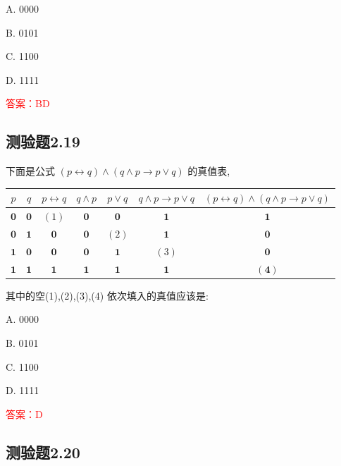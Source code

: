 \documentclass[UTF8, heading=true]{ctexart}
\begin{document}
A. 0000

B. 0101

C. 1100

D. 1111

\textcolor{red}{答案：BD}

\subsection{测验题2.19}

下面是公式 $(p \leftrightarrow q) \wedge(q \wedge p \rightarrow p \vee q)$ 的真值表,


\begin{table}[H]
\centering
\begin{tabular}{c|c|c|c|c|c|c}
\hline$p$ & $q$ & $p \leftrightarrow q$ & $q \wedge p$ & $p \vee q$ & $q \wedge p \rightarrow p \vee q$ & $(p \leftrightarrow q) \wedge(q \wedge p \rightarrow p \vee q)$ \\
\hline $\mathbf{0}$ & $\mathbf{0}$ & $(1)$ & $\mathbf{0}$ & $\mathbf{0}$ & $\mathbf{1}$ & $\mathbf{1}$ \\
\hline $\mathbf{0}$ & $\mathbf{1}$ & $\mathbf{0}$ & $\mathbf{0}$ & $(2)$ & $\mathbf{1}$ & $\mathbf{0}$ \\
\hline $\mathbf{1}$ & $\mathbf{0}$ & $\mathbf{0}$ & $\mathbf{0}$ & $\mathbf{1}$ & $(3)$ & $\mathbf{0}$ \\
\hline $\mathbf{1}$ & $\mathbf{1}$ & $\mathbf{1}$ & $\mathbf{1}$ & $\mathbf{1}$ & $\mathbf{1}$ & $\mathbf{( 4 )}$ \\
\hline
\end{tabular}
\end{table}

其中的空(1),(2),(3),(4) 依次填入的真值应该是:

A. 0000

B. 0101

C. 1100

D. 1111

\textcolor{red}{答案：D}

\subsection{测验题2.20}
\end{document}

